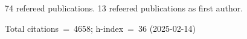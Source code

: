 74 refereed publications. 13 refeered publications as first author.

Total citations~=~4658; h-index~=~36 (2025-02-14)